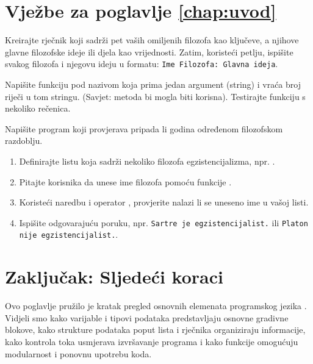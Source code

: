 \section*{Vježbe za poglavlje \ref{chap:uvod}}

\begin{vježba}
    Kreirajte rječnik koji sadrži pet vaših omiljenih filozofa kao ključeve, a njihove glavne filozofske ideje ili djela kao vrijednosti. Zatim, koristeći  petlju, ispišite svakog filozofa i njegovu ideju u formatu: \texttt{Ime Filozofa: Glavna ideja}.
\end{vježba}

\begin{vježba}
    Napišite funkciju pod nazivom  koja prima jedan argument (string) i vraća broj riječi u tom stringu. (Savjet: metoda  bi mogla biti korisna). Testirajte funkciju s nekoliko rečenica.
\end{vježba}

\begin{vježba}
    Napišite program koji provjerava pripada li godina određenom filozofskom razdoblju.
    \begin{enumerate}
        \item Definirajte listu koja sadrži nekoliko filozofa egzistencijalizma, npr. .
        \item Pitajte korisnika da unese ime filozofa pomoću funkcije .
        \item Koristeći  naredbu i operator , provjerite nalazi li se uneseno ime u vašoj listi.
        \item Ispišite odgovarajuću poruku, npr. \texttt{Sartre je egzistencijalist.} ili \texttt{Platon nije egzistencijalist.}.
    \end{enumerate}
\end{vježba}

\section{Zaključak: Sljedeći koraci}
\label{sec:zakljucak}

Ovo poglavlje pružilo je kratak pregled osnovnih elemenata programskog jezika . Vidjeli smo kako varijable i tipovi podataka predstavljaju osnovne gradivne blokove, kako strukture podataka poput lista i rječnika organiziraju informacije, kako kontrola toka usmjerava izvršavanje programa i kako funkcije omogućuju modularnost i ponovnu upotrebu koda.

